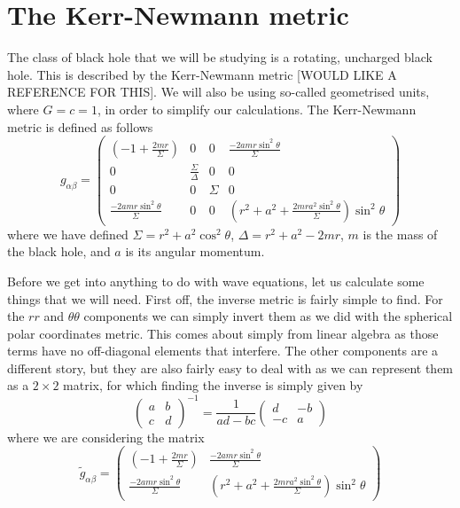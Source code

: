\documentclass[11pt]{article}
\numberwithin{equation}{section}
\numberwithin{figure}{section}
\numberwithin{table}{section}
\begin{document}
\section{The Kerr-Newmann metric}\label{sec:Kerr-Newmann}
\par The class of black hole that we will be studying is a rotating, uncharged black hole. This is described by the Kerr-Newmann metric [WOULD LIKE A REFERENCE FOR THIS]. We will also be using so-called geometrised units, where $G=c=1$, in order to simplify our calculations. The Kerr-Newmann metric is defined as follows
\begin{equation}
    g_{\alpha\beta}=
    \begin{pmatrix}
        (-1+\frac{2mr}{\Sigma}) & 0 & 0 & \frac{-2amr\sin^2\theta}{\Sigma} \\
        0 & \frac{\Sigma}{\Delta} & 0 & 0 \\
        0 & 0 & \Sigma & 0 \\
        \frac{-2amr\sin^2\theta}{\Sigma} & 0 & 0 & \left(r^2+a^2+\frac{2mra^2\sin^2\theta}{\Sigma}\right)\sin^2\theta
    \end{pmatrix}
    \label{eqn:kerr metric}
\end{equation}
where we have defined $\Sigma=r^2+a^2\cos^2\theta$, $\Delta=r^2+a^2-2mr$, $m$ is the mass of the black hole, and $a$ is its angular momentum. 
\par Before we get into anything to do with wave equations, let us calculate some things that we will need. First off, the inverse metric is fairly simple to find. For the $rr$ and $\theta\theta$ components we can simply invert them as we did with the spherical polar coordinates metric. This comes about simply from linear algebra as those terms have no off-diagonal elements that interfere. The other components are a different story, but they are also fairly easy to deal with as we can represent them as a $2\times2$ matrix, for which finding the inverse is simply given by 
\begin{equation*}
    \begin{pmatrix}
        a & b \\
        c & d
    \end{pmatrix}^{-1}
    =
    \frac{1}{ad-bc}
    \begin{pmatrix}
        d & -b \\
        -c & a
    \end{pmatrix}
\end{equation*}
where we are considering the matrix
\begin{equation*}
    \tilde{g}_{\alpha\beta}=
    \begin{pmatrix}
        (-1+\frac{2mr}{\Sigma}) & \frac{-2amr\sin^2\theta}{\Sigma} \\
        \frac{-2amr\sin^2\theta}{\Sigma} & \left(r^2+a^2+\frac{2mra^2\sin^2\theta}{\Sigma}\right)\sin^2\theta
    \end{pmatrix}
\end{equation*}
\end{document}
